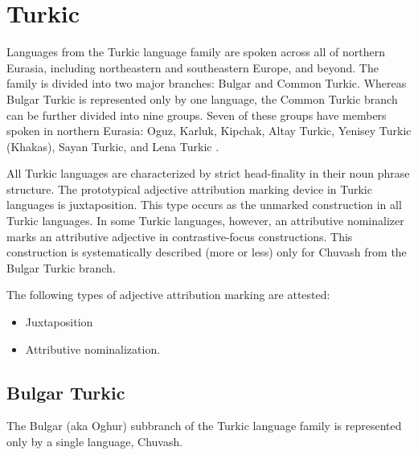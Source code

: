 \section{Turkic}
Languages from the Turkic language family are spoken across all of northern Eurasia, including northeastern and southeastern Europe, and beyond. The family is divided into two major branches: Bulgar and Common Turkic. Whereas Bulgar Turkic is represented only by one language, the Common Turkic branch can be further divided into nine groups. Seven of these groups have members spoken in northern Eurasia: Oguz, Karluk, Kipchak, Altay Turkic, Yenisey Turkic (Khakas), Sayan Turkic, and Lena Turkic \cite[221]{salminen2007}.

All Turkic languages are characterized by strict head-finality in their noun phrase structure. The prototypical adjective attribution marking device in Turkic languages is juxtaposition. This type occurs as the unmarked construction in all Turkic languages. In some Turkic languages, however, an attributive nominalizer marks an attributive adjective in contrastive-focus constructions. This construction is systematically described (more or less) only for Chuvash from the Bulgar Turkic branch.

The following types of adjective attribution marking are attested:
\begin{itemize}
\item Juxtaposition
\item Attributive nominalization.
\end{itemize}

\subsection{Bulgar Turkic}
The Bulgar (aka Oghur) subbranch of the Turkic language family is represented only by a single language, Chuvash.

